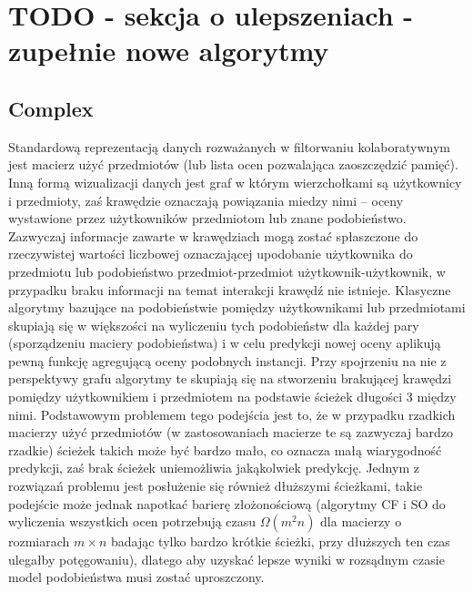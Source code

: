 \documentclass{pracamgr}
\begin{document}
  \section{TODO - sekcja o ulepszeniach - zupełnie nowe algorytmy}
   \subsection{Complex}
    Standardową reprezentacją danych rozważanych w filtorwaniu kolaboratywnym jest macierz użyć przedmiotów (lub lista ocen pozwalająca zaoszczędzić pamięć).
    Inną formą wizualizacji danych jest graf w którym wierzchołkami są użytkownicy i przedmioty, zaś krawędzie oznaczają powiązania miedzy nimi
    -- oceny wystawione przez użytkowników przedmiotom lub znane podobieństwo. Zazwyczaj informacje zawarte w krawędziach mogą zostać spłaszczone do
    rzeczywistej wartości liczbowej oznaczającej upodobanie użytkownika do przedmiotu lub podobieństwo przedmiot-przedmiot użytkownik-użytkownik,
    w przypadku braku informacji na temat interakcji krawędź nie istnieje.
    Klasyczne algorytmy bazujące na podobieństwie pomiędzy użytkownikami lub przedmiotami skupiają się w większości na wyliczeniu tych podobieństw
    dla każdej pary (sporządzeniu maciery podobieństwa) i w celu predykcji nowej oceny aplikują pewną funkcję agregującą oceny podobnych instancji.
    Przy spojrzeniu na nie z perspektywy grafu algorytmy te skupiają się na stworzeniu brakującej krawędzi pomiędzy użytkownikiem i przedmiotem na podstawie
    ścieżek długości 3 między nimi.\newline
    Podstawowym problemem tego podejścia jest to, że w przypadku rzadkich macierzy użyć przedmiotów (w zastosowaniach macierze te są zazwyczaj bardzo rzadkie)
    ścieżek takich może być bardzo mało, co oznacza małą wiarygodność predykcji, zaś brak ścieżek uniemożliwia jakąkolwiek predykcję.
    Jednym z rozwiązań problemu jest posłużenie się również dłuższymi ścieżkami, takie podejście może jednak napotkać barierę złożonościową
    (algorytmy CF i SO do wyliczenia wszystkich ocen potrzebują czasu $\Omega(m^2n)$ dla macierzy o rozmiarach $m\times n$ badając tylko bardzo krótkie ścieżki,
    przy dłuższych ten czas ulegałby potęgowaniu), dlatego aby uzyskać lepsze wyniki w rozsądnym czasie model podobieństwa musi zostać uproszczony.
\end{document}
